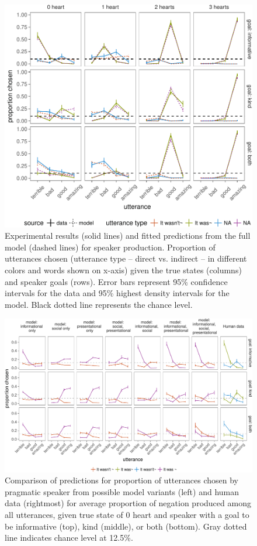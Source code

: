 \documentclass[floatsintext,man]{apa6}
\theoremstyle{definition}
\theoremstyle{definition}
\theoremstyle{definition}
\theoremstyle{remark}
\begin{document}
\begin{figure}[!h]
\includegraphics[width=\textwidth]{polite_NHB_files/figure-latex/utterance-1} \caption{Experimental results (solid lines) and fitted predictions from the full model (dashed lines) for speaker production. Proportion of utterances chosen (utterance type – direct vs. indirect – in different colors and words shown on x-axis) given the true states (columns) and speaker goals (rows). Error bars represent 95\% confidence intervals for the data and 95\% highest density intervals for the model. Black dotted line represents the chance level.}\label{fig:utterance}
\end{figure}

\begin{figure}[!h]
\includegraphics[width=\textwidth]{polite_NHB_files/figure-latex/comparisonAll-1} \caption{Comparison of predictions for proportion of utterances chosen by pragmatic speaker from possible model variants (left) and human data (rightmost) for average proportion of negation produced among all utterances, given true state of 0 heart and speaker with a goal to be informative (top), kind (middle), or both (bottom). Gray dotted line indicates chance level at 12.5\%.}\label{fig:comparisonAll}
\end{figure}
\end{document}
